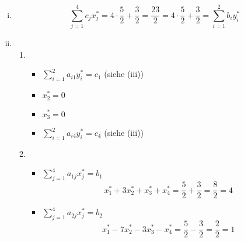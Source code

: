 \documentclass[a4paper]{scrartcl}
\begin{document}
\begin{enumerate}[label=\bfseries\arabic*.]
\begin{enumerate}
\begin{enumerate}[(i)]
                    \item
                        \begin{equation}
                            \sum_{j=1}^4 c_jx_j^* = 4 \cdot \frac{5}{2} + \frac{3}{2} = \frac{23}{2} = 4 \cdot \frac{5}{2} + \frac{3}{2} = \sum_{i=1}^2 b_iy_i^*
                        \end{equation}

                    \item
                        \begin{enumerate}
                            \item
                                \begin{itemize}
                                    \item $\sum_{i=1}^2 a_{i1}y_i^* = c_1$ (siehe (iii))

                                    \item $x_2^* = 0$

                                    \item $x_3^* = 0$

                                    \item $\sum_{i=1}^2 a_{i4}y_i^* = c_4$ (siehe (iii))

                                \end{itemize}

                            \item
                                \begin{itemize}
                                    \item $\sum_{j=1}^4 a_{1j}x_j^* = b_1$ \\
                                        \begin{equation}
                                            x_1^* +3x_2^* +x_3^* +x_4^* = \frac{5}{2} + \frac{3}{2} = \frac{8}{2} = 4
                                        \end{equation}
                                        
                                    \item $\sum_{j=1}^4 a_{2j}x_j^* = b_2$ \\
                                        \begin{equation}
                                            x_1^* -7x_2^* -3x_3^* -x_4^* = \frac{5}{2} - \frac{3}{2} = \frac{2}{2} = 1
                                        \end{equation}
                                        

\end{itemize}
\end{enumerate}
\end{enumerate}
\end{enumerate}
\end{enumerate}
\end{document}
